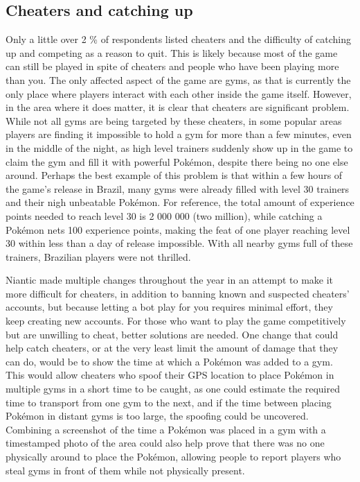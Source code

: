 \subsection{Cheaters and catching up}
\label{sec:cheaters-analysis}
Only a little over 2 \% of respondents listed cheaters and the difficulty of catching up and competing as a reason to quit. This is likely because most of the game can still be played in spite of cheaters and people who have been playing more than you. The only affected aspect of the game are gyms, as that is currently the only place where players interact with each other inside the game itself. However, in the area where it does matter, it is clear that cheaters are significant problem. While not all gyms are being targeted by these cheaters, in some popular areas players are finding it impossible to hold a gym for more than a few minutes, even in the middle of the night, as high level trainers suddenly show up in the game to claim the gym and fill it with powerful Pokémon, despite there being no one else around. Perhaps the best example of this problem is that within a few hours of the game's release in Brazil, many gyms were already filled with level 30 trainers and their nigh unbeatable Pokémon. For reference, the total amount of experience points needed to reach level 30 is 2 000 000 (two million), while catching a Pokémon nets 100 experience points, making the feat of one player reaching level 30 within less than a day of release impossible. With all nearby gyms full of these trainers, Brazilian players were not thrilled.

Niantic made multiple changes throughout the year in an attempt to make it more difficult for cheaters, in addition to banning known and suspected cheaters' accounts, but because letting a bot play for you requires minimal effort, they keep creating new accounts. For those who want to play the game competitively but are unwilling to cheat, better solutions are needed. One change that could help catch cheaters, or at the very least limit the amount of damage that they can do, would be to show the time at which a Pokémon was added to a gym. This would allow cheaters who spoof their GPS location to place Pokémon in multiple gyms in a short time to be caught, as one could estimate the required time to transport from one gym to the next, and if the time between placing Pokémon in distant gyms is too large, the spoofing could be uncovered. Combining a screenshot of the time a Pokémon was placed in a gym with a timestamped photo of the area could also help prove that there was no one physically around to place the Pokémon, allowing people to report players who steal gyms in front of them while not physically present.

